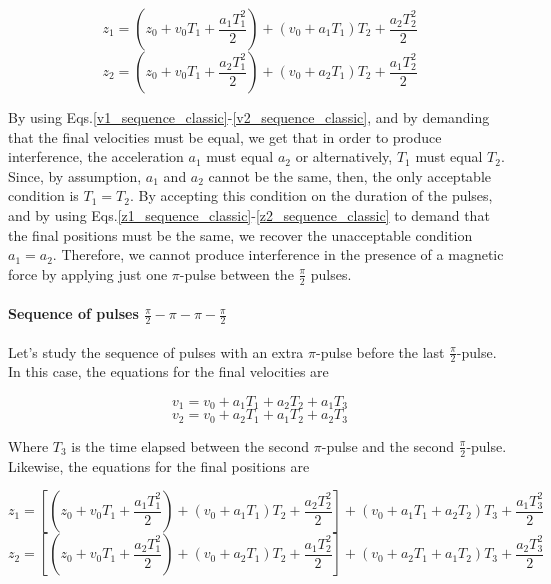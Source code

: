 \documentclass{article}
\begin{document}
\begin{equation}\label{z1_sequence_classic}
z_{1} = (z_{0} + v_{0} T_{1} + \frac{a_{1} T^{2}_{1}}{2}) + (v_{0}+a_{1}T_{1})T_{2} + \frac{a_{2} T^{2}_{2}}{2}
\end{equation}
\begin{equation}\label{z2_sequence_classic}
z_{2} = (z_{0} + v_{0} T_{1} + \frac{a_{2} T^{2}_{1}}{2}) + (v_{0}+a_{2}T_{1})T_{2} + \frac{a_{1} T^{2}_{2}}{2}
\end{equation}

By using Eqs.\ref{v1_sequence_classic}-\ref{v2_sequence_classic}, and by demanding that the final velocities must be equal, we get that in order to produce interference, the acceleration $a_{1}$ must equal $a_{2}$ or alternatively, $T_{1}$ must equal $T_{2}$. Since, by assumption, $a_{1}$ and $a_{2}$ cannot be the same, then, the only acceptable condition is $T_{1}=T_{2}$. By accepting this condition on the duration of the pulses, and by using Eqs.\ref{z1_sequence_classic}-\ref{z2_sequence_classic} to demand that the final positions must be the same, we recover the unacceptable condition $a_{1}=a_{2}$. Therefore, we cannot produce interference in the presence of a magnetic force by applying just one $\pi$-pulse between the $\frac{\pi}{2}$ pulses.

\paragraph{Sequence of pulses $\frac{\pi}{2} - \pi - \pi - \frac{\pi}{2}$}

Let's study the sequence of pulses with an extra $\pi$-pulse before the last $\frac{\pi}{2}$-pulse. In this case, the equations for the final velocities are

\begin{equation}\label{final_v1}
v_{1} = v_{0} + a_{1} T_{1} + a_{2} T_{2} + a_{1} T_{3}
\end{equation}
\begin{equation}\label{final_v2}
v_{2} = v_{0} + a_{2} T_{1} + a_{1} T_{2} + a_{2} T_{3}
\end{equation}

Where $T_{3}$ is the time elapsed between the second $\pi$-pulse and the second $\frac{\pi}{2}$-pulse. Likewise, the equations for the final positions are

\begin{equation}\label{final_z1}
z_{1} = [(z_{0} + v_{0} T_{1} + \frac{a_{1} T^{2}_{1}}{2}) + (v_{0} + a_{1}T_{1})T_{2} + \frac{a_{2} T^{2}_{2}}{2}] + (v_{0}+a_{1}T_{1} + a_{2}T_{2})T_{3} + \frac{a_{1} T^{2}_{3}}{2}
\end{equation}
\begin{equation}\label{final_z2}
z_{2} = [(z_{0} + v_{0} T_{1} + \frac{a_{2} T^{2}_{1}}{2}) + (v_{0} + a_{2}T_{1})T_{2} + \frac{a_{1} T^{2}_{2}}{2}] + (v_{0}+a_{2}T_{1} + a_{1}T_{2})T_{3} + \frac{a_{2} T^{2}_{3}}{2}
\end{equation}
\end{document}

